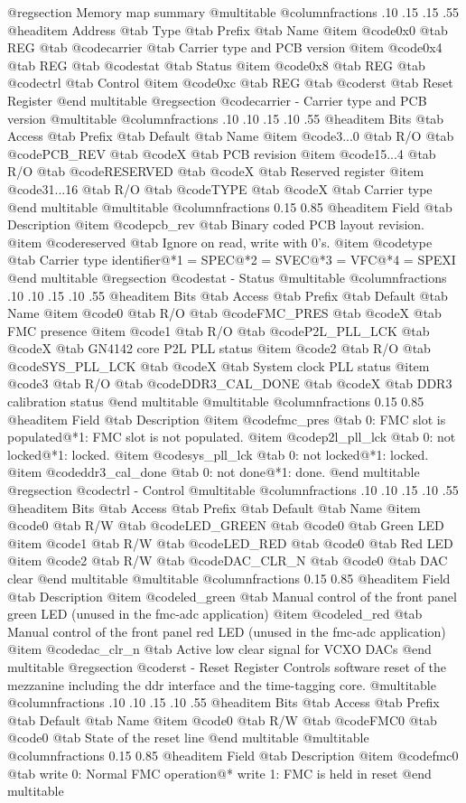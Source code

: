 @regsection Memory map summary
@multitable  @columnfractions .10 .15 .15 .55
@headitem Address @tab Type @tab Prefix @tab Name
@item @code{0x0} @tab
REG @tab
@code{carrier} @tab
Carrier type and PCB version
@item @code{0x4} @tab
REG @tab
@code{stat} @tab
Status
@item @code{0x8} @tab
REG @tab
@code{ctrl} @tab
Control
@item @code{0xc} @tab
REG @tab
@code{rst} @tab
Reset Register
@end multitable 
@regsection @code{carrier} - Carrier type and PCB version
@multitable @columnfractions .10 .10 .15 .10 .55
@headitem Bits @tab Access @tab Prefix @tab Default @tab Name
@item @code{3...0}
@tab R/O @tab
@code{PCB_REV}
@tab @code{X} @tab 
PCB revision
@item @code{15...4}
@tab R/O @tab
@code{RESERVED}
@tab @code{X} @tab 
Reserved register
@item @code{31...16}
@tab R/O @tab
@code{TYPE}
@tab @code{X} @tab 
Carrier type
@end multitable
@multitable @columnfractions 0.15 0.85
@headitem Field @tab Description
@item @code{pcb_rev} @tab Binary coded PCB layout revision.
@item @code{reserved} @tab Ignore on read, write with 0's.
@item @code{type} @tab Carrier type identifier@*1 = SPEC@*2 = SVEC@*3 = VFC@*4 = SPEXI
@end multitable
@regsection @code{stat} - Status
@multitable @columnfractions .10 .10 .15 .10 .55
@headitem Bits @tab Access @tab Prefix @tab Default @tab Name
@item @code{0}
@tab R/O @tab
@code{FMC_PRES}
@tab @code{X} @tab 
FMC presence
@item @code{1}
@tab R/O @tab
@code{P2L_PLL_LCK}
@tab @code{X} @tab 
GN4142 core P2L PLL status
@item @code{2}
@tab R/O @tab
@code{SYS_PLL_LCK}
@tab @code{X} @tab 
System clock PLL status
@item @code{3}
@tab R/O @tab
@code{DDR3_CAL_DONE}
@tab @code{X} @tab 
DDR3 calibration status
@end multitable
@multitable @columnfractions 0.15 0.85
@headitem Field @tab Description
@item @code{fmc_pres} @tab 0: FMC slot is populated@*1: FMC slot is not populated.
@item @code{p2l_pll_lck} @tab 0: not locked@*1: locked.
@item @code{sys_pll_lck} @tab 0: not locked@*1: locked.
@item @code{ddr3_cal_done} @tab 0: not done@*1: done.
@end multitable
@regsection @code{ctrl} - Control
@multitable @columnfractions .10 .10 .15 .10 .55
@headitem Bits @tab Access @tab Prefix @tab Default @tab Name
@item @code{0}
@tab R/W @tab
@code{LED_GREEN}
@tab @code{0} @tab 
Green LED
@item @code{1}
@tab R/W @tab
@code{LED_RED}
@tab @code{0} @tab 
Red LED
@item @code{2}
@tab R/W @tab
@code{DAC_CLR_N}
@tab @code{0} @tab 
DAC clear
@end multitable
@multitable @columnfractions 0.15 0.85
@headitem Field @tab Description
@item @code{led_green} @tab Manual control of the front panel green LED (unused in the fmc-adc application)
@item @code{led_red} @tab Manual control of the front panel red LED (unused in the fmc-adc application)
@item @code{dac_clr_n} @tab Active low clear signal for VCXO DACs
@end multitable
@regsection @code{rst} - Reset Register
Controls software reset of the mezzanine including the ddr interface and the time-tagging core.
@multitable @columnfractions .10 .10 .15 .10 .55
@headitem Bits @tab Access @tab Prefix @tab Default @tab Name
@item @code{0}
@tab R/W @tab
@code{FMC0}
@tab @code{0} @tab 
State of the reset line
@end multitable
@multitable @columnfractions 0.15 0.85
@headitem Field @tab Description
@item @code{fmc0} @tab write 0: Normal FMC operation@* 		 write 1: FMC is held in reset
@end multitable
